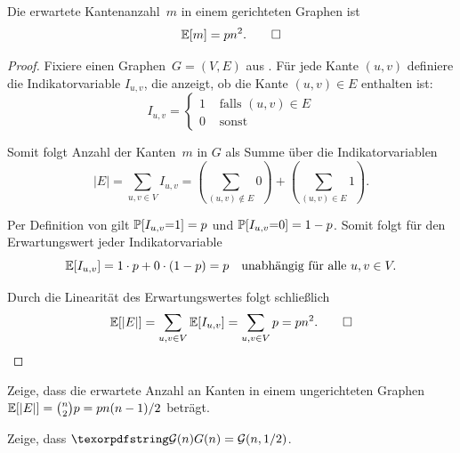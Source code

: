 \begin{lemma}\label{lemma:erwartete_kanten_in_gnp}
    Die  erwartete Kantenanzahl~$m$ in einem gerichteten \Gnp Graphen ist \begin{equation*} \mathbb{E}\!\left[m\right] = p n^2. \qedhere \end{equation*}
\end{lemma}

\begin{proof}
    Fixiere einen Graphen~$G=(V,E)$ aus \Gnp.
    Für jede Kante $(u,v)$ definiere die Indikatorvariable $I_{u,v}$, die anzeigt, ob die Kante $(u,v) \in E$ enthalten ist:
    \begin{equation}
        I_{u,v} = \begin{cases}
            1 & \text{ falls } (u,v) \in E \\
            0 & \text{ sonst }
        \end{cases}
    \end{equation}

    \noindent Somit folgt Anzahl der Kanten~$m$ in $G$ als Summe über die Indikatorvariablen
    \begin{equation}
        |E| = \sum_{u,v \in V} I_{u,v} = \left(\sum_{(u,v) \not\in E} 0 \right) +  \left(\sum_{(u,v) \in E} 1\right).
    \end{equation}

    \noindent Per Definition von \Gnp gilt $\mathbb{P}\!\left[I_{u,v} {=} 1\right] = p$ und $\mathbb{P}\!\left[I_{u,v} {=} 0\right] = 1-p$.
    Somit folgt für den Erwartungswert jeder Indikatorvariable
    \begin{equation}
        \mathbb{E}\!\left[I_{u,v}\right] = 1 \cdot p + 0 \cdot (1-p) = p \quad \text{unabhängig für alle } u, v \in V.
    \end{equation}

    \noindent Durch die Linearität des Erwartungswertes folgt schließlich
    \begin{equation}
        \mathbb{E}\!\left[|E|\right] = \sum_{u,v \in V} \mathbb{E}\!\left[I_{u,v}\right] = \sum_{u,v \in V} p = p n^2. \qedhere
    \end{equation}
\end{proof}

\begin{exercise}
    Zeige, dass die erwartete Anzahl an Kanten in einem ungerichteten \Gnp Graphen $\mathbb{E}\!\left[|E|\right] = \binom{n}{2} p = p n(n-1)/2$ beträgt.
\end{exercise}

\begin{exercise}
    Zeige, dass $\Gn = \mathcal G(n, 1/2)$.
\end{exercise}

